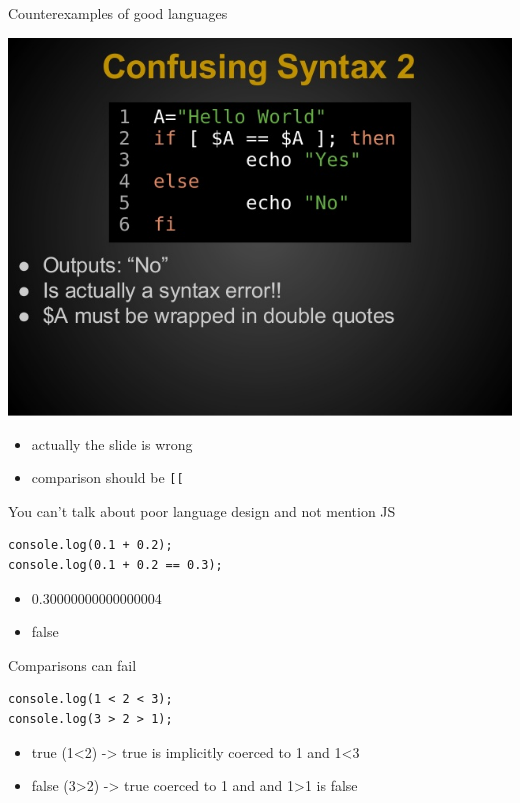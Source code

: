 \documentclass[presetation]{beamer}
\begin{document}
\begin{frame}[fragile,label={sec:org544e3bc}]{Counterexamples of good languages}
 \begin{center}
\includegraphics[width=.6\linewidth]{./images/bashHorror.jpeg}
\end{center}
\pause
\begin{itemize}
\item actually the slide is wrong
\end{itemize}
\pause
\begin{itemize}
\item comparison should be \texttt{[[}
\end{itemize}
\end{frame}


\begin{frame}[fragile,label={sec:org1743c69}]{You can't talk about poor language design and not mention JS}
 \begin{verbatim}
console.log(0.1 + 0.2);
console.log(0.1 + 0.2 == 0.3);
\end{verbatim}
\pause
\begin{itemize}
\item 0.30000000000000004
\item false
\end{itemize}
\end{frame}



\begin{frame}[fragile,label={sec:org6347cf8}]{Comparisons can fail}
 \begin{verbatim}
console.log(1 < 2 < 3);
console.log(3 > 2 > 1);
\end{verbatim}
\pause
\begin{itemize}
\item true (1<2) -> true is implicitly coerced to 1 and 1<3
\item false (3>2) -> true coerced to 1 and and 1>1 is false
\end{itemize}
\end{frame}
\end{document}
